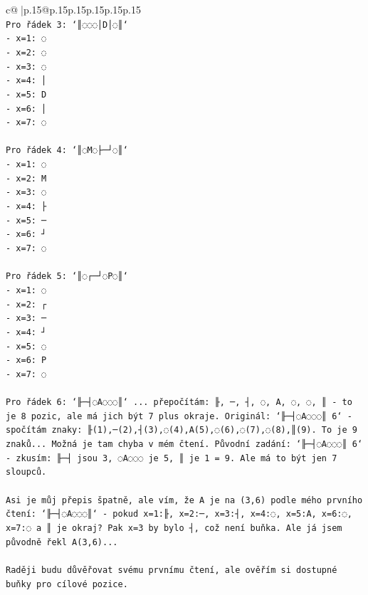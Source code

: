\documentclass{article}
\begin{document}
{\begin{supertabular}{c@{$\;$}|p{.15\linewidth}@{}p{.15\linewidth}p{.15\linewidth}p{.15\linewidth}p{.15\linewidth}p{.15\linewidth}}
{{{\\ 
\texttt{Pro řádek 3: `║◌◌◌│D│◌║`} \\
\texttt{{-} x=1: ◌} \\
\texttt{{-} x=2: ◌} \\
\texttt{{-} x=3: ◌} \\
\texttt{{-} x=4: │} \\
\texttt{{-} x=5: D} \\
\texttt{{-} x=6: │} \\
\texttt{{-} x=7: ◌} \\
\\ 
\texttt{Pro řádek 4: `║◌M◌├─┘◌║`} \\
\texttt{{-} x=1: ◌} \\
\texttt{{-} x=2: M} \\
\texttt{{-} x=3: ◌} \\
\texttt{{-} x=4: ├} \\
\texttt{{-} x=5: ─} \\
\texttt{{-} x=6: ┘} \\
\texttt{{-} x=7: ◌} \\
\\ 
\texttt{Pro řádek 5: `║◌┌─┘◌P◌║`} \\
\texttt{{-} x=1: ◌} \\
\texttt{{-} x=2: ┌} \\
\texttt{{-} x=3: ─} \\
\texttt{{-} x=4: ┘} \\
\texttt{{-} x=5: ◌} \\
\texttt{{-} x=6: P} \\
\texttt{{-} x=7: ◌} \\
\\ 
\texttt{Pro řádek 6: `╟─┤◌A◌◌◌║` ... přepočítám: ╟, ─, ┤, ◌, A, ◌, ◌, ║ {-} to je 8 pozic, ale má jich být 7 plus okraje. Originál: `╟─┤◌A◌◌◌║ 6` {-} spočítám znaky: ╟(1),─(2),┤(3),◌(4),A(5),◌(6),◌(7),◌(8),║(9). To je 9 znaků... Možná je tam chyba v mém čtení. Původní zadání: `╟─┤◌A◌◌◌║ 6` {-} zkusím: ╟─┤ jsou 3, ◌A◌◌◌ je 5, ║ je 1 = 9. Ale má to být jen 7 sloupců.} \\
\\ 
\texttt{Asi je můj přepis špatně, ale vím, že A je na (3,6) podle mého prvního čtení: `╟─┤◌A◌◌◌║` {-} pokud x=1:╟, x=2:─, x=3:┤, x=4:◌, x=5:A, x=6:◌, x=7:◌ a ║ je okraj? Pak x=3 by bylo ┤, což není buňka. Ale já jsem původně řekl A(3,6)... } \\
\\ 
\texttt{Raději budu důvěřovat svému prvnímu čtení, ale ověřím si dostupné buňky pro cílové pozice.} \\
}}}
\end{supertabular}}
\end{document}
